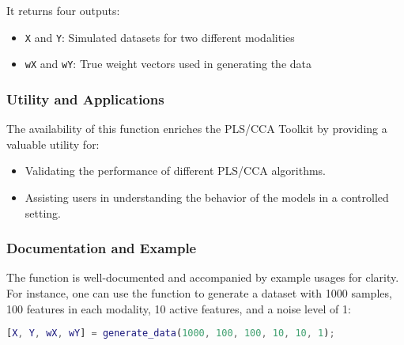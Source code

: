It returns four outputs:

\begin{itemize}
    \item \texttt{X} and \texttt{Y}: Simulated datasets for two different modalities
    \item \texttt{wX} and \texttt{wY}: True weight vectors used in generating the data
\end{itemize}

\subsubsection{Utility and Applications}

The availability of this function enriches the PLS/CCA Toolkit by providing a valuable utility for:

\begin{itemize}
    \item Validating the performance of different PLS/CCA algorithms.
    \item Assisting users in understanding the behavior of the models in a controlled setting.
\end{itemize}

\subsubsection{Documentation and Example}

The function is well-documented and accompanied by example usages for clarity. For instance, one can use the function to generate a dataset with 1000 samples, 100 features in each modality, 10 active features, and a noise level of 1:

\begin{lstlisting}[language=Matlab]
[X, Y, wX, wY] = generate_data(1000, 100, 100, 10, 10, 1);
\end{lstlisting}
